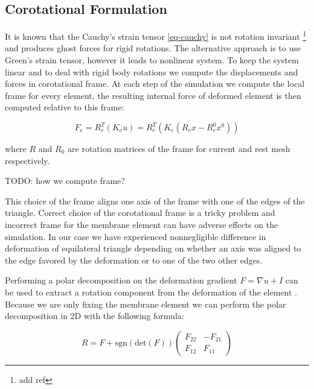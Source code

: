 \documentclass{egpubl}
\begin{document}

\subsection{Corotational Formulation} %
\label{sec-corot}

It is known that the Cauchy's strain tensor \eqref{eq-cauchy} is not
rotation invariant \footnote{add ref} and produces ghost forces for rigid
rotations. The alternative approach is to use Green's strain tensor,
however it leads to nonlinear system. To keep the system linear and to deal
with rigid body rotations we compute the displacements and forces in
corotational frame. At each step of the simulation we compute the local
frame for every element, the resulting internal force of deformed element
is then computed relative to this frame:

\begin{equation}
    F_e = R_e^T (K_e u) = R_e^T \left(K_e(R_e x - R_e^0 x^0)\right)
\end{equation}

\noindent
where $R$ and $R_0$ are rotation matrices of the frame for current and rest
mesh respectively.

TODO: how we compute frame?



This choice of the frame aligns one axis of the frame with one of the edges
of the triangle. Correct choice of the corotational frame is a tricky
problem \cite{Felippa2005} and incorrect frame for the membrane element can
have adverse effects on the simulation. In our case we have experienced
nonnegligible difference in deformation of equilateral triangle depending
on whether an axis was aligned to the edge favored by the deformation or to
one of the two other edges.

Performing a polar decomposition on the deformation gradient $F = \nabla u
+ I$ can be used to extract a rotation component from the deformation of
the element \cite{Ciarlet1994}. Because we are only fixing the membrane
element we can perform the polar decomposition in 2D with the following
formula:

\begin{equation}
    R = F + \mathrm{sgn}(\mathrm{det}(F)) \begin{pmatrix}
        F_{22} & - F_{21} \\
        F_{12} & F_{11}
    \end{pmatrix}
\end{equation}
\end{document}
